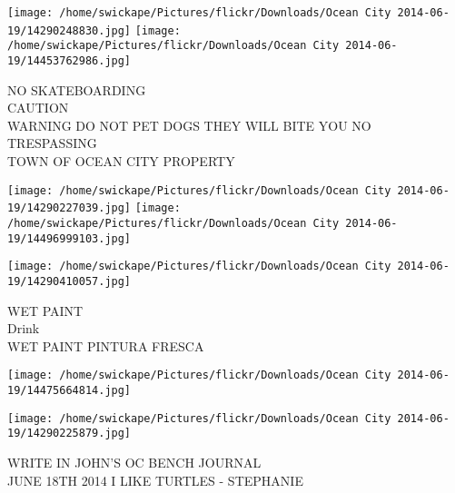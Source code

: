 \documentclass[10pt,letterpaper]{article}
\begin{document}
\texttt{[image: /home/swickape/Pictures/flickr/Downloads/Ocean City 2014-06-19/14290248830.jpg]}
\texttt{[image: /home/swickape/Pictures/flickr/Downloads/Ocean City 2014-06-19/14453762986.jpg]}

NO SKATEBOARDING\\
CAUTION\\
WARNING DO NOT PET DOGS THEY WILL BITE YOU NO TRESPASSING\\
TOWN OF OCEAN CITY PROPERTY
\pagebreak

\texttt{[image: /home/swickape/Pictures/flickr/Downloads/Ocean City 2014-06-19/14290227039.jpg]}
\texttt{[image: /home/swickape/Pictures/flickr/Downloads/Ocean City 2014-06-19/14496999103.jpg]}

\texttt{[image: /home/swickape/Pictures/flickr/Downloads/Ocean City 2014-06-19/14290410057.jpg]}

WET PAINT\\
Drink\\
WET PAINT PINTURA FRESCA
\pagebreak

\texttt{[image: /home/swickape/Pictures/flickr/Downloads/Ocean City 2014-06-19/14475664814.jpg]}

\vspace{0.25in}
\texttt{[image: /home/swickape/Pictures/flickr/Downloads/Ocean City 2014-06-19/14290225879.jpg]}

WRITE IN JOHN'S OC BENCH JOURNAL\\
JUNE 18TH 2014 I LIKE TURTLES {-} STEPHANIE
\pagebreak
\end{document}
